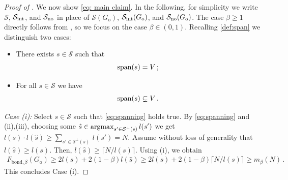 \documentclass[reqno]{amsart}
\theoremstyle{plain}
\theoremstyle{definition}
\numberwithin{equation}{section}
\begin{document}
\begin{proof}[Proof of ]
We now show  \eqref{eq: main claim}.  In the following, for simplicity  we write $\mathcal{S}$, $\mathcal{S}_{\rm int}$,  and   $\mathcal{S}_{\rm no}$ in place of $\mathcal{S}(G_{\mathrm{o}})$, $\mathcal{S}_{\rm int}(G_{\mathrm{o}})$, and  $\mathcal{S}_{\rm no}(G_{\mathrm{o}})$. The case $\beta \ge 1$ directly follows from , so we focus on the case $\beta \in (0,1)$.   Recalling \eqref{def:span} we distinguish two cases:
\begin{itemize}
\item[(i)] There exists $s\in \mathcal{S}$ such that
\begin{align}\label{eq:spanning}
 {\rm span}(s)    =V\,;
\end{align} 
\item[(ii)] For all $s \in \mathcal{S}$  we have
\begin{align}\label{incl:strict}
 {\rm span}(s)   \subsetneq V\,. 
\end{align} 
\end{itemize}

\noindent \emph{Case (i):} Select $s\in \mathcal{S}$ such that  \eqref{eq:spanning} holds true. By \eqref{eq:spanning} and (ii),(iii), choosing some $\hat{s} \in {\rm argmax}_{s' \in \mathcal{S}^\perp(s)}\, l(s')  $ we get $l(s)\cdot l(\hat{s}) \ge \sum_{s' \in \mathcal{S}^\perp(s)}\, l(s')    = N$.  Assume without loss of generality that $l(\hat{s})  \geq l(s)$. Then, $l(\hat{s}) \geq \lceil N/l(s)\rceil$. Using (i), we obtain
\begin{align*}
F_{\mathrm{bond},\beta}(  G_{\mathrm{o}}) \geq 2l(s) + 2(1-\beta)  l(\hat{s}) \geq  2 l(s)  + 2(1-\beta) \lceil N/l(s)\rceil \geq m_\beta(N)\,.
\end{align*}
This concludes Case (i).


\end{proof}
\end{document}
